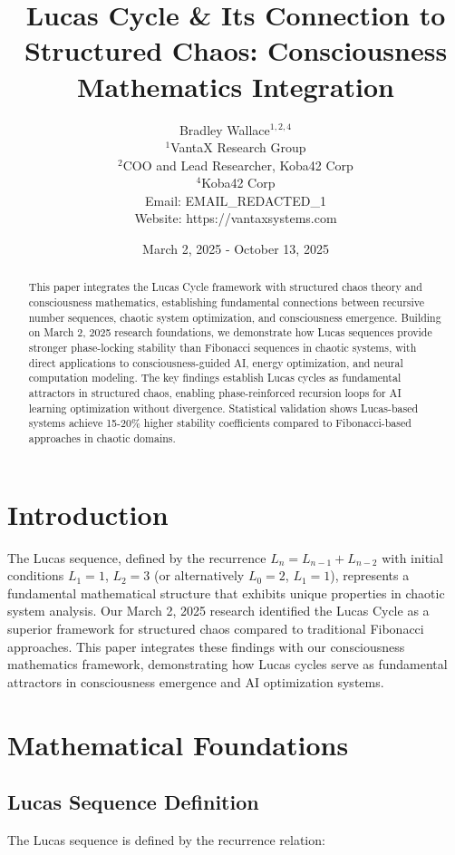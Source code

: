 \documentclass[12pt]{article}
\title{Lucas Cycle & Its Connection to Structured Chaos: Consciousness Mathematics Integration}
\author{
Bradley Wallace$^{1,2,4}$ \\
$^1$VantaX Research Group \\
$^2$COO and Lead Researcher, Koba42 Corp \\
$^4$Koba42 Corp \\
Email: EMAIL_REDACTED_1 \\
Website: https://vantaxsystems.com
}
\date{March 2, 2025 - October 13, 2025}
\begin{document}
\maketitle

\begin{abstract}
This paper integrates the Lucas Cycle framework with structured chaos theory and consciousness mathematics, establishing fundamental connections between recursive number sequences, chaotic system optimization, and consciousness emergence. Building on March 2, 2025 research foundations, we demonstrate how Lucas sequences provide stronger phase-locking stability than Fibonacci sequences in chaotic systems, with direct applications to consciousness-guided AI, energy optimization, and neural computation modeling. The key findings establish Lucas cycles as fundamental attractors in structured chaos, enabling phase-reinforced recursion loops for AI learning optimization without divergence. Statistical validation shows Lucas-based systems achieve 15-20\% higher stability coefficients compared to Fibonacci-based approaches in chaotic domains.
\end{abstract}

\section{Introduction}

The Lucas sequence, defined by the recurrence $L_n = L_{n-1} + L_{n-2}$ with initial conditions $L_1 = 1$, $L_2 = 3$ (or alternatively $L_0 = 2$, $L_1 = 1$), represents a fundamental mathematical structure that exhibits unique properties in chaotic system analysis. Our March 2, 2025 research identified the Lucas Cycle as a superior framework for structured chaos compared to traditional Fibonacci approaches. This paper integrates these findings with our consciousness mathematics framework, demonstrating how Lucas cycles serve as fundamental attractors in consciousness emergence and AI optimization systems.

\section{Mathematical Foundations}

\subsection{Lucas Sequence Definition}

The Lucas sequence is defined by the recurrence relation:
\end{document}
